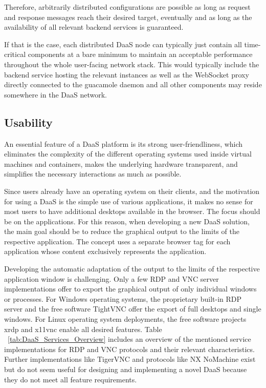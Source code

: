 \documentclass[runningheads]{llncs}
\begin{document}
Therefore, arbitrarily distributed configurations are possible
as long as request and response messages reach their desired target, eventually
and as long as the availability of all relevant backend services is guaranteed.

If that is the case, each distributed DaaS node can typically
just contain all time-critical components at a bare minimum
to maintain an acceptable performance throughout the whole user-facing network stack.
This would typically include the backend service hosting the relevant instances
as well as the WebSocket proxy directly connected to the guacamole daemon
and all other components may reside somewhere in the DaaS network.


\subsection{Usability}


An essential feature of a DaaS platform is its strong user-friendliness, which eliminates the complexity of the different operating systems used inside virtual machines and containers, makes the underlying hardware transparent, and simplifies the necessary interactions as much as possible.

Since users already have an operating system on their clients, and the motivation for using a DaaS is the simple use of various applications, it makes no sense for most users to have additional desktops available in the browser. The focus should be on the applications. For this reason, when developing a new DaaS solution, the main goal should be to reduce the graphical output to the limits of the respective application. The concept uses a separate browser tag for each application whose content exclusively represents the application.

Developing the automatic adaptation of the output to the limits of the respective application window is challenging. Only a few RDP and VNC server implementations offer to export the graphical output of only individual windows or processes. For Windows operating systems, the proprietary built-in RDP server and the free software TightVNC offer the export of full desktops and single windows. For Linux operating system deployments, the free software projects xrdp and x11vnc enable all desired features. Table ~\ref{tab:DaaS_Services_Overview} includes an overview of the mentioned service implementations for RDP and VNC protocols and their relevant characteristics. Further implementations like TigerVNC and protocols like NX NoMachine exist but do not seem useful for designing and implementing a novel DaaS because they do not meet all feature requirements.~\cite{OJCC_2023v8i1n01_Baun}
\end{document}
